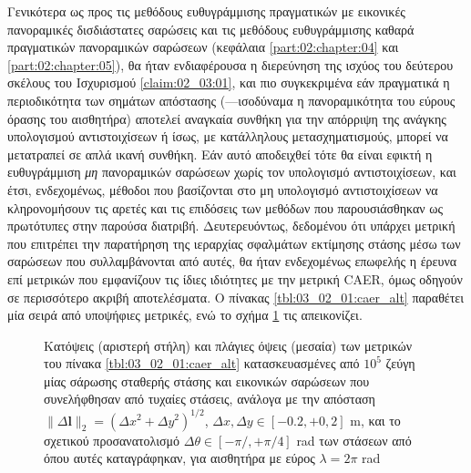 Γενικότερα ως προς τις μεθόδους ευθυγράμμισης πραγματικών με εικονικές
πανοραμικές δισδιάστατες σαρώσεις και τις μεθόδους ευθυγράμμισης καθαρά
πραγματικών πανοραμικών σαρώσεων (κεφάλαια \ref{part:02:chapter:04} και
\ref{part:02:chapter:05}), θα ήταν ενδιαφέρουσα η διερεύνηση της ισχύος του
δεύτερου σκέλους του Ισχυρισμού \ref{claim:02_03:01}, και πιο συγκεκριμένα εάν
πραγματικά η περιοδικότητα των σημάτων απόστασης (---ισοδύναμα η πανοραμικότητα
του εύρους όρασης του αισθητήρα) αποτελεί αναγκαία συνθήκη για την απόρριψη της
ανάγκης υπολογισμού αντιστοιχίσεων ή ίσως, με κατάλληλους μετασχηματισμούς,
μπορεί να μετατραπεί σε απλά ικανή συνθήκη. Εάν αυτό αποδειχθεί τότε θα είναι
εφικτή η ευθυγράμμιση \textit{μη} πανοραμικών σαρώσεων χωρίς τον υπολογισμό
αντιστοιχίσεων, και έτσι, ενδεχομένως, μέθοδοι που βασίζονται στο μη υπολογισμό
αντιστοιχίσεων να κληρονομήσουν τις αρετές και τις επιδόσεις των μεθόδων που
παρουσιάσθηκαν ως πρωτότυπες στην παρούσα διατριβή. Δευτερευόντως, δεδομένου
ότι υπάρχει μετρική που επιτρέπει την παρατήρηση της ιεραρχίας σφαλμάτων
εκτίμησης στάσης μέσω των σαρώσεων που συλλαμβάνονται από αυτές, θα ήταν
ενδεχομένως επωφελής η έρευνα επί μετρικών που εμφανίζουν τις ίδιες ιδιότητες
με την μετρική CAER, όμως οδηγούν σε περισσότερο ακριβή αποτελέσματα. Ο πίνακας
\ref{tbl:03_02_01:caer_alt} παραθέτει μία σειρά από υποψήφιες μετρικές, ενώ το
σχήμα \ref{fig:03_02_01:caer_alt} τις απεικονίζει.

\begin{figure}\centering
  \vspace{-1cm}
  
  \vspace{1cm}
  \caption{\small Κατόψεις (αριστερή στήλη) και πλάγιες όψεις (μεσαία) των
           μετρικών του πίνακα \ref{tbl:03_02_01:caer_alt} κατασκευασμένες από
           $10^5$ ζεύγη μίας σάρωσης σταθερής στάσης και εικονικών σαρώσεων που
           συνελήφθησαν από τυχαίες στάσεις, ανάλογα με την απόσταση $\|\Delta
           \bm{l}\|_2 = (\Delta x^2 + \Delta y^2)^{1/2}$, $\Delta x, \Delta y
           \in [-0.2, +0,2]$ m, και το σχετικού προσανατολισμό $\Delta \theta
           \in [-\pi/, +\pi/4]$ rad των στάσεων από όπου αυτές καταγράφηκαν,
           για αισθητήρα με εύρος $\lambda = 2\pi$ rad}
  \label{fig:03_02_01:caer_alt}
\end{figure}

